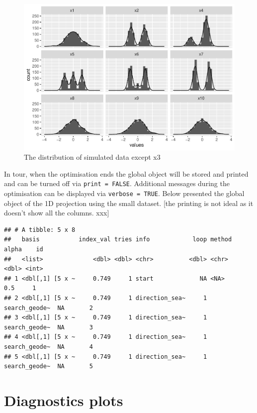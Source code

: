 \documentclass[12pt]{article}
\begin{document}
\begin{figure}
\centering
\includegraphics{paper_files/figure-latex/origin-data-1.pdf}
\caption{\label{origin-data} The distribution of simulated data except
x3}
\end{figure}

In tour, when the optimisation ends the global object will be stored and
printed and can be turned off via \texttt{print\ =\ FALSE}. Additional
messages during the optimisation can be displayed via
\texttt{verbose\ =\ TRUE}. Below presented the global object of the 1D
projection using the small dataset. {[}the printing is not ideal as it
doesn't show all the columns. xxx{]}

\begin{verbatim}
## # A tibble: 5 x 8
##   basis           index_val tries info            loop method        alpha    id
##   <list>              <dbl> <dbl> <chr>          <dbl> <chr>         <dbl> <int>
## 1 <dbl[,1] [5 x ~     0.749     1 start             NA <NA>            0.5     1
## 2 <dbl[,1] [5 x ~     0.749     1 direction_sea~     1 search_geode~  NA       2
## 3 <dbl[,1] [5 x ~     0.749     1 direction_sea~     1 search_geode~  NA       3
## 4 <dbl[,1] [5 x ~     0.749     1 direction_sea~     1 search_geode~  NA       4
## 5 <dbl[,1] [5 x ~     0.749     1 direction_sea~     1 search_geode~  NA       5
\end{verbatim}

\hypertarget{plots}{%
\section{Diagnostics plots}\label{plots}}
\end{document}
